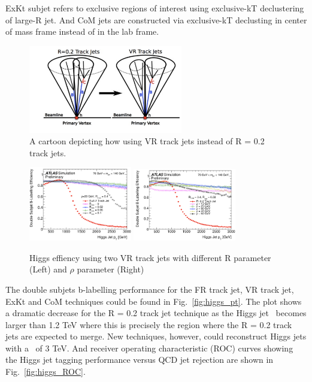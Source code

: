 ExKt subjet refers to exclusive regions of interest using exclusive-kT declustering of large-R jet. 
And CoM jets are constructed via exclusive-kT declusting in center of mass frame instead of in the lab frame.
\begin{figure}[htbp]
 \begin{center}
  \includegraphics[width=0.6\textwidth]{chapters/c5/figures/VR}

 \end{center}
 \caption{A cartoon depicting how using VR track jets instead of R = 0.2 track jets.}
 \label{fig:vr}
\end{figure}
\begin{figure}[htbp]
 \begin{center}
  \includegraphics[width=0.4\textwidth]{chapters/c5/figures/r-vr}
  \includegraphics[width=0.4\textwidth]{chapters/c5/figures/rho-vr}

 \end{center}
    \caption{Higgs effiency using two VR track jets with different R parameter (Left) and $\rho$ parameter (Right)} 
 \label{fig:vr-scan}
\end{figure}
\par The double subjets b-labelling performance for the FR track jet, VR track jet, ExKt and CoM techniques could be found in Fig.~\ref{fig:higgs_pt}.
The plot shows a dramatic decrease for the R = 0.2 track jet technique as the Higgs jet \pt~becomes larger than 1.2 TeV where this is precisely the region where the 
R = 0.2 track jets are expected to merge. 
New techniques, however, could reconstruct Higgs jets with a \pt~of 3 TeV. And receiver operating characteristic (ROC) curves showing the Higgs jet tagging performance versus 
QCD jet rejection are shown 
in Fig.~\ref{fig:higgs_ROC}.


